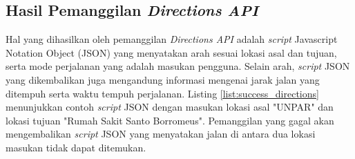 \begin{table}[h]
\begin{tabular}{|p{5cm}|p{6cm}|p{5cm}|}
	\end{tabular}
\end{table}


\subsection{Hasil Pemanggilan \textit{Directions API}}
Hal yang dihasilkan oleh pemanggilan \textit{Directions API} adalah \textit{script} Javascript Notation Object (JSON) yang menyatakan arah  sesuai lokasi asal dan tujuan, serta mode perjalanan yang adalah masukan pengguna. Selain arah, \textit{script} JSON yang dikembalikan juga mengandung informasi mengenai jarak jalan yang ditempuh serta waktu tempuh perjalanan. Listing \ref{list:success_directions} menunjukkan contoh \textit{script} JSON dengan masukan lokasi asal "UNPAR" dan lokasi tujuan "Rumah Sakit Santo Borromeus". Pemanggilan yang gagal akan mengembalikan \textit{script} JSON yang menyatakan jalan di antara dua lokasi masukan tidak dapat ditemukan.


